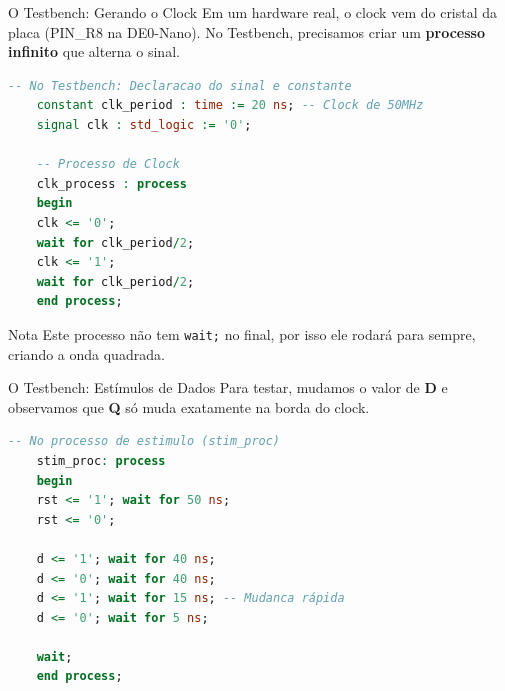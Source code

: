 \documentclass[aspectratio=169]{beamer}
\begin{document}
\begin{frame}[fragile]{O Testbench: Gerando o Clock}
\justifying
Em um hardware real, o clock vem do cristal da placa (PIN\_R8 na DE0-Nano). No Testbench, precisamos criar um \textbf{processo infinito} que alterna o sinal.

\begin{lstlisting}[language=VHDL, basicstyle=\tiny]
	-- No Testbench: Declaracao do sinal e constante
	constant clk_period : time := 20 ns; -- Clock de 50MHz
	signal clk : std_logic := '0';
	
	-- Processo de Clock
	clk_process : process
	begin
	clk <= '0';
	wait for clk_period/2;
	clk <= '1';
	wait for clk_period/2;
	end process;
\end{lstlisting}

\begin{block}{Nota}
	Este processo não tem \texttt{wait;} no final, por isso ele rodará para sempre, criando a onda quadrada.
\end{block}
\end{frame}

\begin{frame}[fragile]{O Testbench: Estímulos de Dados}
\justifying
Para testar, mudamos o valor de \textbf{D} e observamos que \textbf{Q} só muda exatamente na borda do clock.

\begin{lstlisting}[language=VHDL, basicstyle=\tiny]
	-- No processo de estimulo (stim_proc)
	stim_proc: process
	begin
	rst <= '1'; wait for 50 ns;
	rst <= '0';
	
	d <= '1'; wait for 40 ns;
	d <= '0'; wait for 40 ns;
	d <= '1'; wait for 15 ns; -- Mudanca rápida
	d <= '0'; wait for 5 ns;
	
	wait;
	end process;
\end{lstlisting}

\end{frame}
\end{document}
